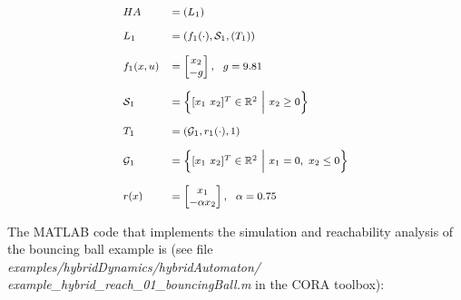 \begin{center}
\begin{minipage}[l]{0.3\columnwidth}
\begin{center}
\end{center}
\end{minipage}
\begin{minipage}[l]{0.6\columnwidth}
\begin{equation*}
\footnotesize
  \begin{array}{ll}
   HA &= (L_1) \\
   & {\tiny ~} \\
   L_1 &= (f_1(\cdot),\mathcal{S}_1,(T_1)) \\
   & {\tiny ~} \\
   f_1(x,u) &= \begin{bmatrix} x_2 \\ -g \end{bmatrix}, ~~ g = 9.81 \\
   & {\tiny ~} \\
   \mathcal{S}_1 &= \Big \{ [x_1 ~x_2]^T \in \mathbb{R}^2~\Big |~ x_2 \geq 0 \Big \} \\
   & {\tiny ~} \\
   T_1 &= (\mathcal{G}_1,r_1(\cdot),1) \\
   & {\tiny ~} \\
   \mathcal{G}_1 &= \Big \{ [x_1 ~x_2]^T \in \mathbb{R}^2~\Big |~ x_1 = 0,~x_2 \leq 0 \Big \} \\
   & {\tiny ~} \\
   r(x) &= \begin{bmatrix} x_1 \\ -\alpha x_2 \end{bmatrix}, ~~ \alpha = 0.75
  \end{array}
\end{equation*}
\end{minipage}
 \label{fig:bouncingBall2}
\end{center}

The MATLAB code that implements the simulation and reachability analysis of the bouncing ball example is (see file \textit{examples/hybridDynamics/hybridAutomaton/}\\ \textit{example\_hybrid\_reach\_01\_bouncingBall.m} in the CORA toolbox):

{\small
}

